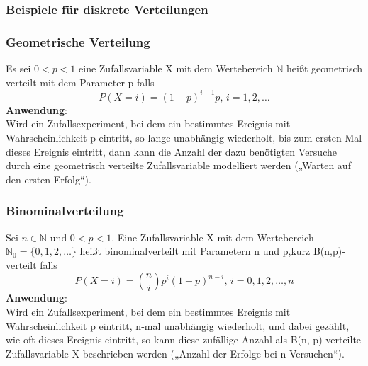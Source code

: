 \documentclass[
	ngerman,
	accentcolor=9c,%
	type=intern,
	marginpar=false
	]{tudapub}
\begin{document}
            \subsubsection{Beispiele für diskrete Verteilungen}
                \subsubsection*{Geometrische Verteilung}
                    Es sei $0<p<1$ eine Zufallsvariable X mit dem Wertebereich $\mathbb{N}$ heißt geometrisch verteilt mit dem Parameter p falls
                    \begin{equation*}
                        P(X=i) = (1-p)^{i-1}p\mbox{, } i = 1,2,\dots
                    \end{equation*}
                    \textbf{Anwendung}:\\
                    Wird ein Zufallsexperiment, bei dem ein bestimmtes Ereignis mit Wahrscheinlichkeit p eintritt,
                    so lange unabhängig wiederholt, bis zum ersten Mal dieses Ereignis eintritt, dann kann die
                    Anzahl der dazu benötigten Versuche durch eine geometrisch verteilte Zufallsvariable modelliert
                    werden („Warten auf den ersten Erfolg“).\\
                \subsubsection*{Binominalverteilung}
                    Sei $n \in \mathbb{N}$ und $0<p<1$. Eine Zufallsvariable X mit dem Wertebereich $\mathbb{N}_0 = \{0,1,2,\dots\}$
                    heißt binominalverteilt mit Parametern n und p,kurz B(n,p)-verteilt falls
                    \begin{equation*}
                        P(X=i) = \binom{n}{i} p^i (1-p)^{n-i}\mbox{, } i = 0,1,2,\dots,n
                    \end{equation*}
                    \textbf{Anwendung}:\\
                    Wird ein Zufallsexperiment, bei dem ein bestimmtes Ereignis mit Wahrscheinlichkeit p eintritt,
                    n-mal unabhängig wiederholt, und dabei gezählt, wie oft dieses Ereignis eintritt, so kann diese
                    zufällige Anzahl als B(n, p)-verteilte Zufallsvariable X beschrieben werden („Anzahl der Erfolge
                    bei n Versuchen“).
\end{document}
